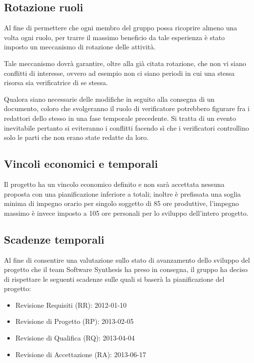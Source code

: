 \subsection{Rotazione ruoli}
Al fine di permettere che ogni membro del gruppo possa ricoprire almeno una volta ogni ruolo, per trarre il massimo beneficio da tale esperienza è stato imposto un meccanismo di rotazione delle attività.

Tale meccanismo dovrà garantire, oltre alla già citata rotazione, che non vi siano conflitti di interesse, ovvero ad esempio non ci siano periodi in cui una stessa risorsa sia verificatrice di se stessa.

Qualora siano necessarie delle modifiche in seguito alla consegna di un documento, coloro che svolgeranno il ruolo di verificatore potrebbero figurare fra i redattori dello stesso in una fase temporale precedente. Si tratta di un evento inevitabile pertanto si eviteranno i conflitti facendo sì che i verificatori controllino solo le parti che non erano state redatte da loro.

\subsection{Vincoli economici e temporali}
Il progetto ha un vincolo economico definito e non sarà accettata nessuna proposta con una pianificazione inferiore a  totali; inoltre è prefissata una soglia minima di impegno orario per singolo soggetto di 85 ore produttive, l'impegno massimo è invece imposto a 105 ore personali per lo sviluppo dell'intero progetto.

\subsection{Scadenze temporali}
Al fine di consentire una valutazione sullo stato di avanzamento dello sviluppo del progetto che il team Software Synthesis ha preso in consegna, il gruppo ha deciso di rispettare le seguenti scadenze sulle quali si baserà la pianificazione del progetto:
\begin{itemize}
\item Revisione Requisiti (RR): 2012-01-10
\item Revisione di Progetto (RP): 2013-02-05
\item Revisione di Qualifica (RQ): 2013-04-04
\item Revisione di Accettazione (RA): 2013-06-17
\end{itemize}
\clearpage

